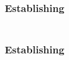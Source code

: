 \begin{frame}
	\frametitle{\bf{Establishing \bMut}}
	{\large{
	\begin{equation}
	\begin{split}
		
	\end{split}
	\label{eq:}
	\end{equation}
	}}
\end{frame}

\begin{frame}
	\frametitle{\bf{Establishing \bMut}}
	{\large{
	\begin{equation}
	\begin{array}{rcl}
		
	\end{array}
	\label{eq:}
	\end{equation}
	}}
\end{frame}